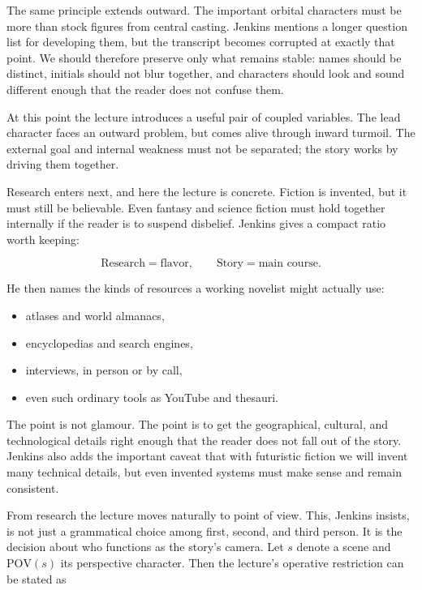The same principle extends outward. The important orbital characters must be more than stock figures from central casting. Jenkins mentions a longer question list for developing them, but the transcript becomes corrupted at exactly that point. We should therefore preserve only what remains stable: names should be distinct, initials should not blur together, and characters should look and sound different enough that the reader does not confuse them.

At this point the lecture introduces a useful pair of coupled variables. The lead character faces an outward problem, but comes alive through inward turmoil. The external goal and internal weakness must not be separated; the story works by driving them together.

Research enters next, and here the lecture is concrete. Fiction is invented, but it must still be believable. Even fantasy and science fiction must hold together internally if the reader is to suspend disbelief. Jenkins gives a compact ratio worth keeping:

\begin{equation}
\text{Research}=\text{flavor},\qquad \text{Story}=\text{main course}.
\end{equation}

He then names the kinds of resources a working novelist might actually use:

\begin{itemize}
\item atlases and world almanacs,
\item encyclopedias and search engines,
\item interviews, in person or by call,
\item even such ordinary tools as YouTube and thesauri.
\end{itemize}

The point is not glamour. The point is to get the geographical, cultural, and technological details right enough that the reader does not fall out of the story. Jenkins also adds the important caveat that with futuristic fiction we will invent many technical details, but even invented systems must make sense and remain consistent.

From research the lecture moves naturally to point of view. This, Jenkins insists, is not just a grammatical choice among first, second, and third person. It is the decision about who functions as the story's camera. Let \(s\) denote a scene and \(\mathrm{POV}(s)\) its perspective character. Then the lecture's operative restriction can be stated as


